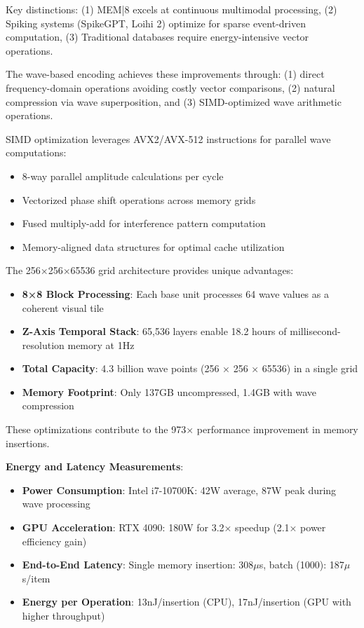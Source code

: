 \documentclass[11pt,letterpaper]{article}
\begin{document}
Key distinctions: (1) MEM|8 excels at continuous multimodal processing, (2) Spiking systems (SpikeGPT, Loihi 2) optimize for sparse event-driven computation, (3) Traditional databases require energy-intensive vector operations.

The wave-based encoding achieves these improvements through: (1) direct frequency-domain operations avoiding costly vector comparisons, (2) natural compression via wave superposition, and (3) SIMD-optimized wave arithmetic operations.

SIMD optimization leverages AVX2/AVX-512 instructions for parallel wave computations:
\begin{itemize}
\item 8-way parallel amplitude calculations per cycle
\item Vectorized phase shift operations across memory grids
\item Fused multiply-add for interference pattern computation
\item Memory-aligned data structures for optimal cache utilization
\end{itemize}

The 256×256×65536 grid architecture provides unique advantages:
\begin{itemize}
\item \textbf{8×8 Block Processing}: Each base unit processes 64 wave values as a coherent visual tile
\item \textbf{Z-Axis Temporal Stack}: 65,536 layers enable 18.2 hours of millisecond-resolution memory at 1Hz
\item \textbf{Total Capacity}: 4.3 billion wave points (256 × 256 × 65536) in a single grid
\item \textbf{Memory Footprint}: Only 137GB uncompressed, 1.4GB with wave compression
\end{itemize}

These optimizations contribute to the 973× performance improvement in memory insertions.

\textbf{Energy and Latency Measurements}:
\begin{itemize}
\item \textbf{Power Consumption}: Intel i7-10700K: 42W average, 87W peak during wave processing
\item \textbf{GPU Acceleration}: RTX 4090: 180W for 3.2× speedup (2.1× power efficiency gain)
\item \textbf{End-to-End Latency}: Single memory insertion: 308$\mu$s, batch (1000): 187$\mu$s/item
\item \textbf{Energy per Operation}: 13nJ/insertion (CPU), 17nJ/insertion (GPU with higher throughput)
\end{itemize}
\end{document}
